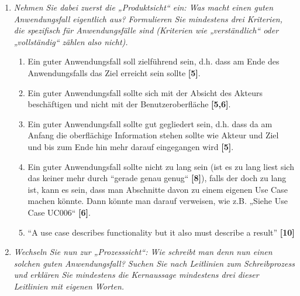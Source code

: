 \begin{enumerate}[a)]
\begin{enumerate}[1.]
        \item {\itshape Nehmen Sie dabei zuerst die „Produktsicht“ ein: Was macht einen guten Anwendungsfall eigentlich aus? Formulieren Sie mindestens drei Kriterien, die spezifisch für Anwendungsfälle sind (Kriterien wie „verständlich“ oder „vollständig“ zählen also nicht).}
        \begin{enumerate}[1.]
            ``Ultimately, use cases are about clearly communicating detailed information to a very diverse audience and reaching the goal of creating successful development projects.'' \textbf{[16]}
            \item Ein guter Anwendungsfall soll zielführend sein, d.h. dass am Ende des Anwendungsfalls das Ziel erreicht sein sollte \textbf{[5]}.
            \item Ein guter Anwendungsfall sollte sich mit der Absicht des Akteurs beschäftigen und nicht mit der Benutzeroberfläche \textbf{[5,6]}.
            \item Ein guter Anwendungsfall sollte gut gegliedert sein, d.h. dass da am Anfang die oberflächige Information stehen sollte wie Akteur und Ziel und bis zum Ende hin mehr darauf eingegangen wird \textbf{[5]}.
            \item Ein guter Anwendungsfall sollte nicht zu lang sein (ist es zu lang liest sich das keiner mehr durch “gerade genau genug“ \textbf{[8]}), falls der doch zu lang ist, kann es sein, dass man Abschnitte davon zu einem eigenen Use Case machen könnte. Dann könnte man darauf verweisen, wie z.B. „Siehe Use Case UC006“ \textbf{[6]}.
            \item ``A use case describes functionality but it also must describe a result'' \textbf{[10]}
           
        \end{enumerate}
        
        \item {\itshape Wechseln Sie nun zur „Prozesssicht“: Wie schreibt man denn nun einen solchen guten Anwendungsfall? Suchen Sie nach Leitlinien zum Schreibprozess und erklären Sie mindestens die Kernaussage mindestens drei dieser Leitlinien mit eigenen Worten.}
        

\end{enumerate}
\end{enumerate}
